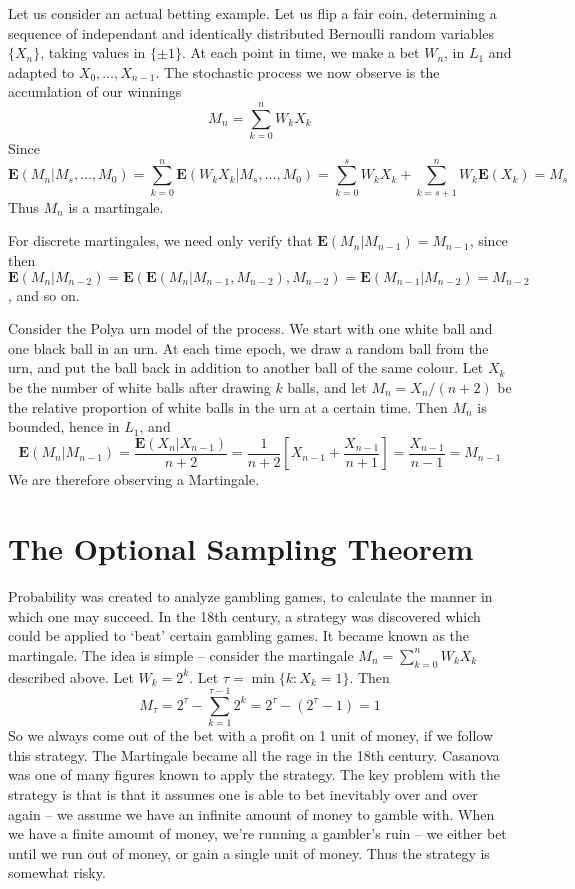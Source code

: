 \begin{example}
    Let us consider an actual betting example. Let us flip a fair coin, determining a sequence of independant and identically distributed Bernoulli random variables $\{ X_n \}$, taking values in $\{ \pm 1 \}$. At each point in time, we make a bet $W_n$, in $L_1$ and adapted to $X_0, \dots, X_{n-1}$. The stochastic process we now observe is the accumlation of our winnings
    \[ M_n = \sum_{k = 0}^n W_k X_k \]
    Since
    \[ \mathbf{E}(M_n | M_s, \dots, M_0) = \sum_{k = 0}^n \mathbf{E}(W_k X_k | M_s, \dots, M_0) = \sum_{k = 0}^s W_k X_k + \sum_{k = s+1}^n W_k \mathbf{E}(X_k) = M_s \]
    Thus $M_n$ is a martingale.
\end{example}

For discrete martingales, we need only verify that $\mathbf{E}(M_n | M_{n-1}) = M_{n-1}$, since then $\mathbf{E}(M_n | M_{n-2}) = \mathbf{E}(\mathbf{E}(M_n | M_{n-1}, M_{n-2}), M_{n-2}) = \mathbf{E}(M_{n-1} | M_{n-2}) = M_{n-2}$, and so on.

\begin{example}
    Consider the Polya urn model of the process. We start with one white ball and one black ball in an urn. At each time epoch, we draw a random ball from the urn, and put the ball back in addition to another ball of the same colour. Let $X_k$ be the number of white balls after drawing $k$ balls, and let $M_n = X_n / (n+2)$ be the relative proportion of white balls in the urn at a certain time. Then $M_n$ is bounded, hence in $L_1$, and
    \[ \mathbf{E}(M_n | M_{n-1}) = \frac{\mathbf{E}(X_n | X_{n-1})}{n+2} = \frac{1}{n+2} [ X_{n-1} + \frac{X_{n-1}}{n+1} ] = \frac{X_{n-1}}{n-1} = M_{n-1} \]
    We are therefore observing a Martingale.
\end{example}

\section{The Optional Sampling Theorem}

Probability was created to analyze gambling games, to calculate the manner in which one may succeed. In the 18th century, a strategy was discovered which could be applied to `beat' certain gambling games. It became known as the martingale. The idea is simple -- consider the martingale $M_n = \sum_{k = 0}^n W_k X_k$ described above. Let $W_k = 2^k$. Let $\tau = \min \{ k : X_k = 1 \}$. Then
%
\[ M_\tau = 2^\tau - \sum_{k = 1}^{\tau-1} 2^k = 2^\tau - (2^\tau - 1) = 1 \]
%
So we always come out of the bet with a profit on 1 unit of money, if we follow this strategy. The Martingale became all the rage in the 18th century. Casanova was one of many figures known to apply the strategy. The key problem with the strategy is that is that it assumes one is able to bet inevitably over and over again --  we assume we have an infinite amount of money to gamble with. When we have a finite amount of money, we're running a gambler's ruin -- we either bet until we run out of money, or gain a single unit of money. Thus the strategy is somewhat risky.

